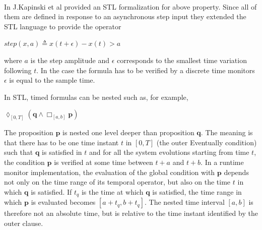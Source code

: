 \paragraph{} In \citep{kapinski2016st} J.Kapinski et al provided an STL formalization for above property. Since all of them are defined in response to an asynchronous step input they extended the STL language to provide the operator
\begin{center}
$step(x,a) \triangleq x(t+\epsilon) - x(t) > a$
\end{center}
where $a$ is the step amplitude and $\epsilon$ corresponds to the smallest time variation following $t$. 
In the case the formula has to be verified by a discrete time monitors $\epsilon$ is equal to the sample time.
\par In STL, timed formulas can be nested such as, for example,
\begin{center}
$\lozenge_{[0, T]}(\textbf{q} \wedge \Box_{[a,b]} \textbf{p})$
\end{center}
The proposition $\textbf{p}$ is nested one level deeper than proposition $\textbf{q}$. The meaning is that there has to be one time instant $t$ in $[0,T]$ (the outer Eventually condition) such that $\textbf{q}$ is satisfied in $t$ and for all the system evolutions starting from time $t$, the condition $\textbf{p}$ is verified at some time between $t + a$ and $t + b$. In a runtime monitor implementation, the evaluation of the global condition with $\textbf{p}$ depends not only on the time range of its temporal operator, but also on the time $t$ in which $\textbf{q}$ is satisfied. If $t_q$ is the time at which $\textbf{q}$ is satisfied, the time range in which $\textbf{p}$ is evaluated becomes $[a + t_q , b + t_q]$. The nested time interval $[a , b]$ is therefore not an absolute time, but is relative to the time instant identified by the outer clause.
